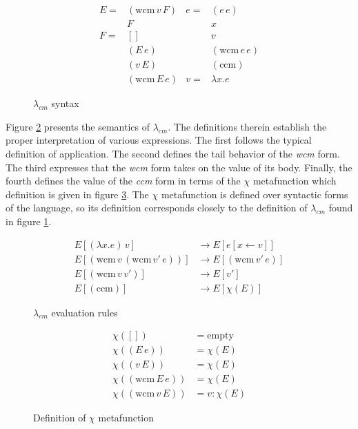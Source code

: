 \documentclass[ms]{byuprop}
\newcounter{definition}
\begin{document}
\begin{figure}
\begin{align*}
E = &(\mathrm{wcm}\,v\,F) & e = &(e\,e)\\
    &F                    &     &x\\
F = &[]                   &     &v\\
    &(E\,e)               &     &(\mathrm{wcm}\,e\,e)\\
    &(v\,E)               &     &(\mathrm{ccm})\\
    &(\mathrm{wcm}\,E\,e) & v = & \lambda x. e
\end{align*}
\caption{$\lambda_{cm}$ syntax}
\label{language-grammar}
\end{figure}

Figure \ref{language-semantics} presents the semantics of $\lambda_{cm}$. The 
definitions therein establish the proper interpretation of various expressions. 
The first follows the typical definition of application. The second defines 
the tail behavior of the \emph{wcm} form. The third expresses that the 
\emph{wcm} form takes on the value of its body. Finally, the fourth defines 
the value of the \emph{ccm} form in terms of the $\chi$ metafunction which 
definition is given in figure \ref{chi-metafunction}.
The $\chi$ metafunction is defined over syntactic forms of the language, so its 
definition corresponds closely to the definition of $\lambda_{cm}$ found in 
figure \ref{language-grammar}.

\begin{figure}
\begin{align*}
E[(\lambda x.e)\,v]                         &\rightarrow E[e[x\leftarrow v]]\\
E[(\mathrm{wcm}\,v\,(\mathrm{wcm}\,v'\,e))] &\rightarrow E[(\mathrm{wcm}\,v'\,e)]\\
E[(\mathrm{wcm}\,v\,v')]                    &\rightarrow E[v']\\
E[(\mathrm{ccm})]                           &\rightarrow E[\chi(E)]
\end{align*}
\caption{$\lambda_{cm}$ evaluation rules}
\label{language-semantics}
\end{figure}

\begin{figure}
\begin{align*}
\chi([])                   &= \mathrm{empty}\\
\chi((E\,e))               &= \chi(E)\\
\chi((v\,E))               &= \chi(E)\\
\chi((\mathrm{wcm}\,E\,e)) &= \chi(E)\\
\chi((\mathrm{wcm}\,v\,E)) &= v : \chi(E)
\end{align*}
\caption{Definition of $\chi$ metafunction}
\label{chi-metafunction}
\end{figure}
\end{document}
